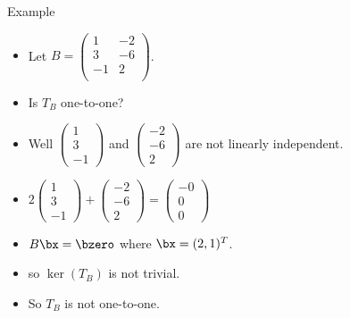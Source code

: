 \documentclass{beamer}
\begin{document}
\begin{frame}{Example}
\begin{itemize}
\item Let
$B =
\begin{pmatrix}
1 & -2 \\
3 & -6 \\
-1 & 2  \\
\end{pmatrix}
$.
\item Is $T_B$ one-to-one?
\item Well
$
\begin{pmatrix}
1 \\ 3 \\ -1
\end{pmatrix}
$
and
$
\begin{pmatrix}
-2 \\ -6 \\ 2
\end{pmatrix}
$
are not linearly independent.
\item
$
2
\begin{pmatrix}
1 \\ 3 \\ -1
\end{pmatrix}
+
\begin{pmatrix}
-2 \\ -6 \\ 2
\end{pmatrix}
=
\begin{pmatrix}
-0 \\ 0 \\ 0
\end{pmatrix}
$

\item $B\bx=\bzero$ where $\bx = (2,1)^{T}$.
\item so $\ker(T_B)$ is not trivial.
\item So $T_B$ is not one-to-one.
\end{itemize}

\end{frame}
\end{document}
